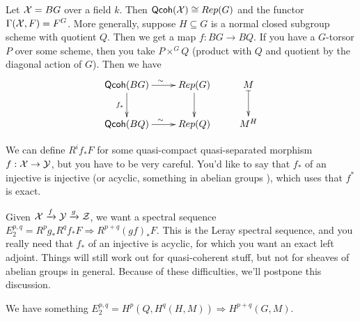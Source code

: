 \begin{example}
   Let $\mathcal{X}=BG$ over a field $k$. Then $\text{\sf Qcoh}(\mathcal{X})\cong Rep(G)$ and the
functor $\Gamma(\mathcal{X},F)=F^G$. More generally, suppose $H\subseteq G$ is a
normal closed subgroup scheme with quotient $Q$. Then we get a map
$f:BG\to BQ$. If you have a $G$-torsor $P$ over some scheme, then you
take $P\times^G Q$ (product with $Q$ and quotient by the diagonal
action of $G$). Then we have
  \[\xymatrix{
    \qco(BG)\ar[r]^\sim \ar[d]_{f_*} & Rep(G)\ar[d]& M\ar@{|->}[d]\\
    \qco(BQ)\ar[r]^\sim & Rep(Q)& M^H
  }\]
\end{example}
\begin{warning}
  We can define $R^if_*F$ for some quasi-compact quasi-separated
morphism $f:\mathcal{X}\to \mathcal{Y}$, but you have to be very careful. You'd like to
say that $f_*$ of an injective is injective (or acyclic, something in
abelian groups \anton{}), which uses that $f^*$ is exact.

  Given $\mathcal{X}\xrightarrow f \mathcal{Y}\xrightarrow g \mathcal{Z}$, we want a spectral
sequence $E^{p,q}_2=R^pg_*R^qf_*F\Rightarrow R^{p+q}(gf)_*F$. This is
the Leray spectral sequence, and you really need that $f_*$ of an
injective is acyclic, for which you want an exact left adjoint.
Things will still work out for quasi-coherent stuff, but not for
sheaves of abelian groups in general. Because of these difficulties,
we'll postpone this discussion.

  We have something $E^{p,q}_2=H^p(Q,H^q(H,M))\Rightarrow
H^{p+q}(G,M)$.
\end{warning}
